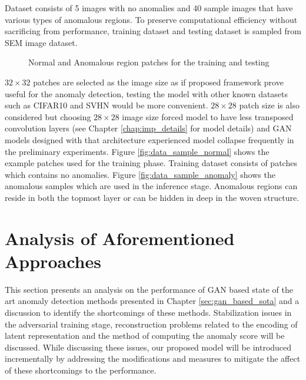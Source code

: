 Dataset consists of 5 images with no anomalies and 40 sample images that have various types of
anomalous regions. To preserve computational efficiency without sacrificing from performance,
training dataset and testing dataset is sampled from SEM image dataset.
\begin{figure}[h!] 
	\hspace*{\fill} 
	\caption{Normal and Anomalous region patches for the training and testing}
	\label{fig:data_samples}
\end{figure}

$32 \times 32$ patches are selected as the image size as if proposed framework prove useful for the
anomaly detection, testing the model with other known datasets such as CIFAR10 \cite{cifar10} and
SVHN \cite{Netzer2011ReadingDI} would be more convenient. $28 \times 28$ patch size is also
considered but choosing $28 \times 28$ image size forced model to have less transposed convolution
layers (see Chapter \ref{chap:imp_details} for model details) and GAN models designed with that
architecture experienced model collapse frequently in the preliminary experiments. Figure
\ref{fig:data_sample_normal} shows the example patches used for the training phase. Training dataset
consists of patches which contains no anomalies. Figure \ref{fig:data_sample_anomaly} shows the
anomalous samples which are used in the inference stage. Anomalous regions can reside in both
the topmost layer or can be hidden in deep in the woven structure.


\section{Analysis of Aforementioned Approaches}
\label{sec:analysis_before}

This section presents an analysis on the performance of GAN based state of the art anomaly detection
methods presented in Chapter \ref{sec:gan_based_sota} and a discussion to identify the shortcomings
of these methods. Stabilization issues in the adversarial training stage, reconstruction problems
related to the encoding of latent representation and the method of computing the anomaly score will
be discussed. While discussing these issues, our proposed model will be introduced incrementally by
addressing the modifications and measures to mitigate the affect of these shortcomings to the
performance.

